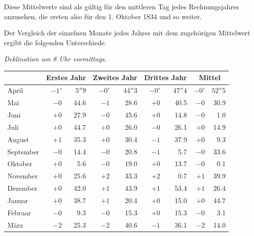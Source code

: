 Diese Mittelwerte sind als gültig für den mittleren Tag jedes Rechnungsjahres anzusehen, die ersten also für den 1. Oktober 1834 und so weiter.

Der Vergleich der einzelnen Monate jedes Jahres mit dem zugehörigen Mittelwert ergibt die folgenden Unterschiede.
\begin{center}\small
\textit{Deklination um 8 Uhr vormittags.}\par\smallskip
\begin{tabular}{l|rr|rr|rr||rr}
&\multicolumn{2}{c|}{Erstes Jahr}&\multicolumn{2}{c|}{Zweites Jahr}&\multicolumn{2}{c||}{Drittes Jahr}&\multicolumn{2}{c}{Mittel}\\\hline
April&$-1'$&$5''9$&$-0'$&$44''3$&$-0'$&$47''4$&$-0'$&$52''5$\\
Mai&$-0$&44.6&$-1$&28.6&$+0$&40.5&$-0$&30.9\\
Juni&$+0$&27.9&$-0$&45.6&$+0$&14.8&$-0$&1.0\\
Juli&$+0$&44.7&$+0$&26.0&$-0$&26.1&$+0$&14.9\\
August&$+1$&35.3&$+0$&30.4&$-1$&37.9&$+0$&9.3\\
September&$-0$&14.4&$-0$&20.8&$-1$&5.7&$-0$&33.6\\
Oktober&$+0$&5.6&$-0$&19.0&$+0$&13.7&$-0$&0.1\\
November&$+0$&25.6&$+2$&33.3&$+2$&0.7&$+1$&39.9\\
Dezember&$+0$&42.0&$+1$&43.9&$+1$&53.4&$+1$&26.4\\
Januar&$+0$&38.7&$+1$&20.4&$+0$&15.0&$+0$&44.7\\
Februar&$-0$&9.3&$-0$&15.3&$+0$&15.3&$-0$&3.1\\
März&$-2$&25.3&$-2$&40.6&$-1$&36.1&$-2$&14.0
\end{tabular}
\end{center}
